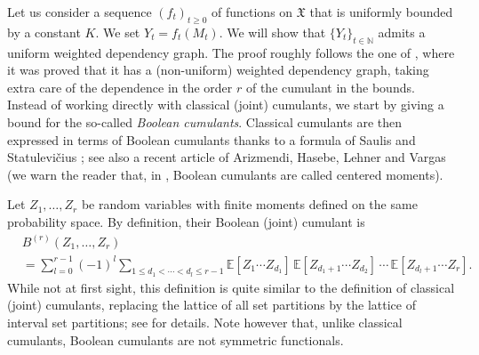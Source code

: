 \documentclass[envcountsame]{svmult}
\newcommand{\N}{\mathbb{N}}
\newcommand{\esper}{\mathbb{E}}
\newcommand{\spa}{\mathfrak{X}}
\begin{document}
Let us consider a sequence $(f_t)_{t \ge 0}$ of functions on $\spa$  that is uniformly bounded by a constant $K$.
We set $Y_t=f_t(M_t)$. We will show that $\{Y_t\}_{t \in \N}$ admits a uniform weighted dependency graph.
The proof roughly follows the one of \cite[Section 10]{WDG}, where it was proved
that it has a (non-uniform) weighted dependency graph, taking extra care of the dependence in the
order $r$ of the cumulant in the bounds. 
Instead of working directly with classical (joint) cumulants,
we start by giving a bound for the so-called {\em Boolean cumulants}. 
Classical cumulants are then expressed in terms of Boolean cumulants
thanks to a formula of Saulis and Statulevi\v{c}ius \cite[Lemma 1.1]{LivreOrange:Cumulants};
see also a recent article of
Arizmendi, Hasebe, Lehner and Vargas \cite{ArizmendiHasebeLehnerVargas2014}
(we warn the reader that, in \cite{LivreOrange:Cumulants},
Boolean cumulants are called centered moments).\bigskip


Let $Z_1,\ldots,Z_r$ be random variables with finite moments defined on the same probability space.
By definition, their Boolean (joint) cumulant is
\begin{align*}
  &B^{(r)}(Z_1,\ldots,Z_r) \\
  &= \sum_{l=0}^{r-1} (-1)^{l} \!\!\!\!\sum_{1\le d_1 < \cdots <d_l \le r-1} \!\!\!\!\!\!\!
\esper[Z_1 \cdots Z_{d_1}] \, \esper[Z_{d_1+1} \cdots Z_{d_2}] \, \cdots \, \esper[Z_{d_l+1} \cdots Z_r].
\end{align*}
While not at first sight, this definition is quite similar to the definition of classical (joint) cumulants,
replacing the lattice of all set partitions by the lattice of interval set partitions;
see \cite[Section 2]{ArizmendiHasebeLehnerVargas2014} for details.
Note however that, unlike classical cumulants, Boolean cumulants are not symmetric functionals.
\end{document}
